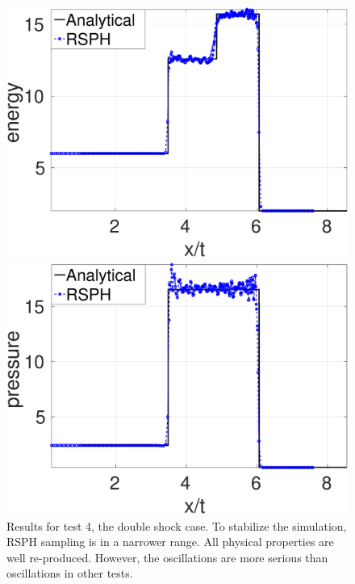 \begin{figure}
\begin{minipage}{.415\textwidth}
        \includegraphics[width=0.99 \textwidth]{./Chapter-4/Figures/double_shock/Dshock-RCM-e-Rp6}
    \end{minipage}%
    \begin{minipage}{.415 \textwidth}
        \centering
        \includegraphics[width=0.99 \textwidth]{./Chapter-4/Figures/double_shock/Dshock-RCM-p-Rp6}
    \end{minipage}%
    \caption{Results for test 4, the double shock case. To stabilize the simulation, RSPH sampling is in a narrower range. All physical properties are well re-produced. However, the oscillations are more serious than oscillations in other tests.}
    \label{fig:RCM-double-shock}
\end{figure}

